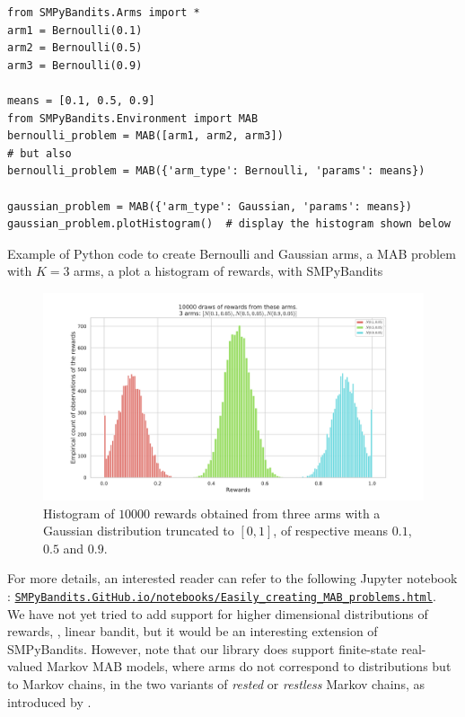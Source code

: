 \begin{small}
\begin{listing}[h!]
    \begin{verbatim}
from SMPyBandits.Arms import *
arm1 = Bernoulli(0.1)
arm2 = Bernoulli(0.5)
arm3 = Bernoulli(0.9)

means = [0.1, 0.5, 0.9]
from SMPyBandits.Environment import MAB
bernoulli_problem = MAB([arm1, arm2, arm3])
# but also
bernoulli_problem = MAB({'arm_type': Bernoulli, 'params': means})

gaussian_problem = MAB({'arm_type': Gaussian, 'params': means})
gaussian_problem.plotHistogram()  # display the histogram shown below
    \end{verbatim}
    \caption{Example of Python code to create Bernoulli and Gaussian arms, a MAB problem with $K=3$ arms, a plot a histogram of rewards, with SMPyBandits}
    \label{lst:3:pythonCodeCreateProblem}
\end{listing}
\end{small}

\begin{figure}[h!]  %
	\centering
	\includegraphics[width=0.75\linewidth]{exampleOfRewards.pdf}
	\caption{Histogram of $10000$ \iid{} rewards obtained from three arms with a Gaussian distribution truncated to $[0,1]$, of respective means $0.1$, $0.5$ and $0.9$.}
	\label{fig:3:exampleOfRewards}
\end{figure}

For more details, an interested reader can refer to the following Jupyter notebook \cite{jupyter}:
\href{https://smpybandits.github.io/notebooks/Easily_creating_MAB_problems.html}{\texttt{SMPyBandits.GitHub.io/notebooks/Easily\_creating\_MAB\_problems.html}}.\\
%
We have not yet tried to add support for higher dimensional distributions of rewards, \eg, linear bandit, but it would be an interesting extension of SMPyBandits.
%
However, note that our library does support finite-state real-valued Markov MAB models, where arms do not correspond to distributions but to Markov chains, in the two variants of \emph{rested} or \emph{restless} Markov chains, as introduced by \cite{Anantharam87b}.

